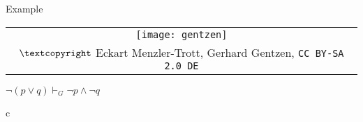 \begin{frame}{Example}

\begin{center}
		\begin{tabular}{c}
		\texttt{[image: gentzen]}\\[-1ex]
		{\tiny $\textcopyright$ Eckart Menzler-Trott, Gerhard Gentzen, \texttt{CC BY-SA 2.0 DE}}
		\end{tabular}
		\vspace{2ex}
		
		$\neg(p\lor q)\vdash_G \neg p\land \neg q$
		\end{center}
		
		
\begin{center}
		\begin{tabular}{c}
		\end{tabular}
	\end{center}
\end{frame}

